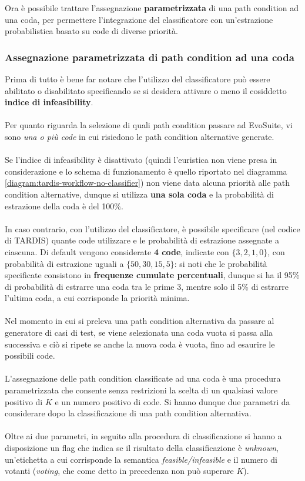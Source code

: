 \documentclass[a4paper, 12pt, oneside]{book}
\theoremstyle{normal}
\begin{document}
\clearpage \noindent Ora è possibile trattare l'assegnazione \textbf{parametrizzata} di una path condition ad una coda, per permettere l'integrazione del classificatore con un'estrazione probabilistica basato su code di diverse priorità.

\subsubsection{Assegnazione parametrizzata di path condition ad una coda}
Prima di tutto è bene far notare che l'utilizzo del classificatore può essere abilitato o disabilitato specificando se si desidera attivare o meno il cosiddetto \textbf{indice di infeasibility}.
\\ \\ Per quanto riguarda la selezione di quali path condition passare ad EvoSuite, vi sono \emph{una o più code} in cui risiedono le path condition alternative generate. 
\\ \\ Se l'indice di infeasibility è disattivato (quindi l'euristica non viene presa in considerazione e lo schema di funzionamento è quello riportato nel diagramma \ref{diagram:tardis-workflow-no-classifier}) non viene data alcuna priorità alle path condition alternative, dunque si utilizza \textbf{una sola coda} e la probabilità di estrazione della coda è del 100\%. \\ \\ In caso contrario, con l'utilizzo del classificatore, è possibile specificare (nel codice di TARDIS) quante code utilizzare e le probabilità di estrazione assegnate a ciascuna. Di default vengono considerate \textbf{4 code}, indicate con $\{ 3, 2, 1, 0 \}$, con probabilità di estrazione uguali a $\{ 50, 30, 15, 5 \}$: si noti che le probabilità specificate consistono in \textbf{frequenze cumulate percentuali}, dunque si ha il 95\% di probabilità di estrarre una coda tra le prime 3, mentre solo il 5\% di estrarre l'ultima coda, a cui corrisponde la priorità minima. \\ \\ Nel momento in cui si preleva una path condition alternativa da passare al generatore di casi di test, se viene selezionata una coda vuota si passa alla successiva e ciò si ripete se anche la nuova coda è vuota, fino ad esaurire le possibili code. \\ \\ L'assegnazione delle path condition classificate ad una coda è una procedura parametrizzata che consente senza restrizioni la scelta di un qualsiasi valore positivo di $K$ e un numero positivo di code. Si hanno dunque due parametri da considerare dopo la classificazione di una path condition alternativa. \\ \\ Oltre ai due parametri, in seguito alla procedura di classificazione si hanno a disposizione un flag che indica se il risultato della classificazione è \emph{unknown}, un'etichetta a cui corrisponde la semantica \emph{feasible/infeasible} e il numero di votanti (\emph{voting}, che come detto in precedenza non può superare $K$).
\end{document}
